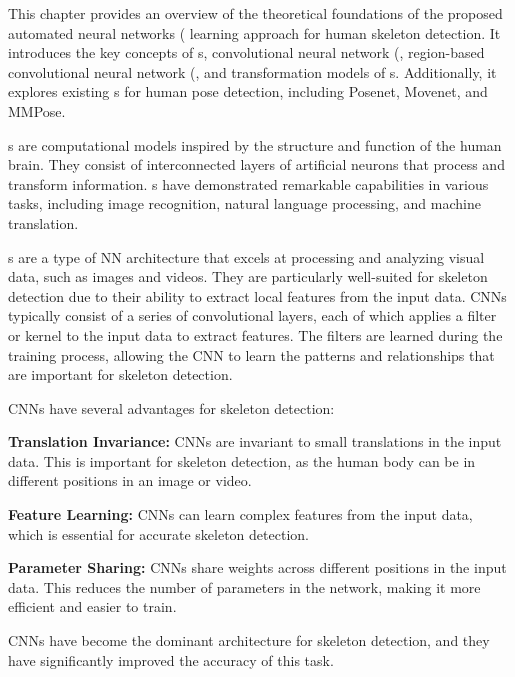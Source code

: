 This chapter provides an overview of the theoretical foundations of the proposed automated neural networks (\NN\) learning approach for human skeleton detection. It introduces the key concepts of \NN\-s, convolutional neural network  (\CNN\), region-based convolutional neural network  (\RCNN\), and transformation models of \NN\-s. Additionally, it explores existing \NN\-s for human pose detection, including Posenet, Movenet, and MMPose.

\NN\-s  are computational models inspired by the structure and function of the human brain. They consist of interconnected layers of artificial neurons that process and transform information. \NN\-s  have demonstrated remarkable capabilities in various tasks, including image recognition, natural language processing, and machine translation.

\CNN\-s are a type of NN architecture that excels at processing and analyzing visual data, such as images and videos. They are particularly well-suited for skeleton detection due to their ability to extract local features from the input data. CNNs typically consist of a series of convolutional layers, each of which applies a filter or kernel to the input data to extract features. The filters are learned during the training process, allowing the CNN to learn the patterns and relationships that are important for skeleton detection.

CNNs have several advantages for skeleton detection:

\startitemize[1]
    \item {\bf Translation Invariance:} CNNs are invariant to small translations in the input data. This is important for skeleton detection, as the human body can be in different positions in an image or video.
    \item {\bf Feature Learning:} CNNs can learn complex features from the input data, which is essential for accurate skeleton detection.
    \item {\bf Parameter Sharing:} CNNs share weights across different positions in the input data. This reduces the number of parameters in the network, making it more efficient and easier to train.
\stopitemize

CNNs have become the dominant architecture for skeleton detection, and they have significantly improved the accuracy of this task.

